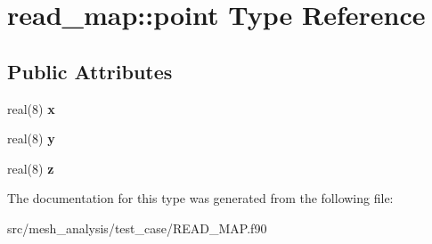 \hypertarget{structread__map_1_1point}{\section{read\-\_\-map\-:\-:point Type Reference}
\label{structread__map_1_1point}
}
\subsection*{Public Attributes}
\begin{DoxyCompactItemize}
\item 
\hypertarget{structread__map_1_1point_a9c7137561107e8eff278d72e723c44f3}{real(8) {\bfseries x}}\label{structread__map_1_1point_a9c7137561107e8eff278d72e723c44f3}

\item 
\hypertarget{structread__map_1_1point_a31dedcbc2e71171090852912a4c0247d}{real(8) {\bfseries y}}\label{structread__map_1_1point_a31dedcbc2e71171090852912a4c0247d}

\item 
\hypertarget{structread__map_1_1point_ac937c64a20091ec67b073a1fd0f00562}{real(8) {\bfseries z}}\label{structread__map_1_1point_ac937c64a20091ec67b073a1fd0f00562}

\end{DoxyCompactItemize}


The documentation for this type was generated from the following file\-:\begin{DoxyCompactItemize}
\item 
src/mesh\-\_\-analysis/test\-\_\-case/R\-E\-A\-D\-\_\-\-M\-A\-P.\-f90\end{DoxyCompactItemize}
